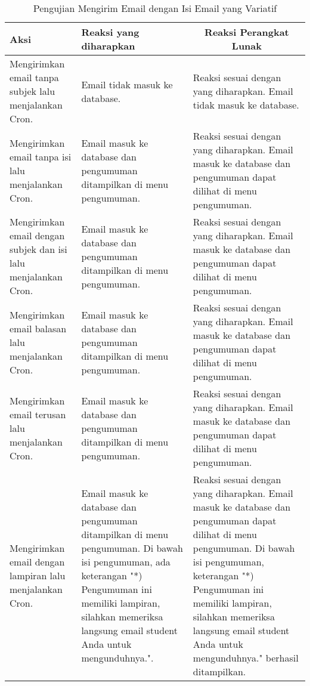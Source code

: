 \begin{itemize}
      \begin{longtable}{|p{5cm}|p{5cm}|p{5cm}|}
        \caption{Pengujian Mengirim Email dengan Isi Email yang Variatif}
        \label{table:pengujian-fungsional-isi-variatif}\\
        \hline
        \centering Aksi	& 	\centering Reaksi yang diharapkan &  \multicolumn{1}{c|}{Reaksi Perangkat Lunak} \\
        \hline
        Mengirimkan email tanpa subjek lalu menjalankan Cron. & Email tidak masuk ke database. & Reaksi sesuai dengan yang diharapkan. Email tidak masuk ke database. \\
        \hline
        Mengirimkan email tanpa isi lalu menjalankan Cron. & Email masuk ke database dan pengumuman ditampilkan di menu pengumuman. & Reaksi sesuai dengan yang diharapkan. Email masuk ke database dan pengumuman dapat dilihat di menu pengumuman. \\
        \hline
        Mengirimkan email dengan subjek dan isi lalu menjalankan Cron. & Email masuk ke database dan pengumuman ditampilkan di menu pengumuman. & Reaksi sesuai dengan yang diharapkan. Email masuk ke database dan pengumuman dapat dilihat di menu pengumuman. \\
        \hline
        Mengirimkan email balasan lalu menjalankan Cron. & Email masuk ke database dan pengumuman ditampilkan di menu pengumuman. & Reaksi sesuai dengan yang diharapkan. Email masuk ke database dan pengumuman dapat dilihat di menu pengumuman. \\
        \hline
        Mengirimkan email terusan lalu menjalankan Cron. & Email masuk ke database dan pengumuman ditampilkan di menu pengumuman. & Reaksi sesuai dengan yang diharapkan. Email masuk ke database dan pengumuman dapat dilihat di menu pengumuman. \\
        \hline
        Mengirimkan email dengan lampiran lalu menjalankan Cron. & Email masuk ke database dan pengumuman ditampilkan di menu pengumuman. Di bawah isi pengumuman, ada keterangan "*) Pengumuman ini memiliki lampiran, silahkan memeriksa langsung email student Anda untuk mengunduhnya.". & Reaksi sesuai dengan yang diharapkan. Email masuk ke database dan pengumuman dapat dilihat di menu pengumuman. Di bawah isi pengumuman, keterangan "*) Pengumuman ini memiliki lampiran, silahkan memeriksa langsung email student Anda untuk mengunduhnya." berhasil ditampilkan. \\
        \hline

\end{longtable}
\end{itemize}
